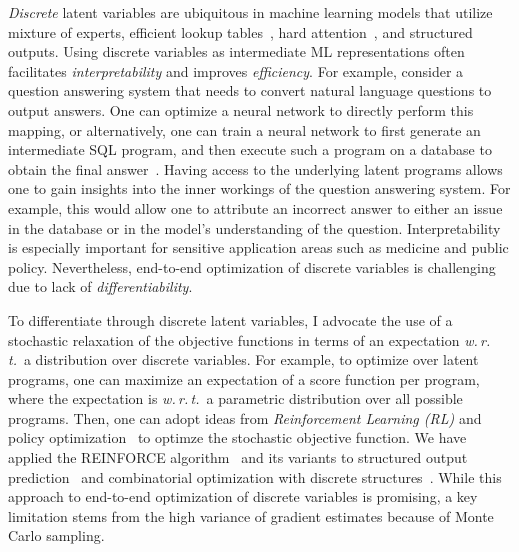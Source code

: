 \documentclass[a4paper, 10pt]{article}
\begin{document}
\hspace{\parindent} {\em Discrete} latent variables are ubiquitous in
machine learning models that utilize mixture of experts, efficient
lookup tables~\cite{mih}, hard attention~\cite{hardattention}, and
structured outputs. Using discrete variables as intermediate ML
representations often facilitates {\em interpretability} and improves
{\em efficiency}. For example, consider a question answering system
that needs to convert natural language questions to output
answers. One can optimize a neural network to directly perform this
mapping, or alternatively, one can train a neural network to first
generate an intermediate SQL program, and then execute such a program
on a database to obtain the final answer~\cite{mapo}. Having access to
the underlying latent programs allows one to gain insights into the
inner workings of the question answering system. For example, this
would allow one to attribute an incorrect answer to either an issue in the
database or in the model's understanding of the
question. Interpretability is especially important for sensitive
application areas such as medicine and public policy. Nevertheless,
end-to-end optimization of discrete variables is challenging due to
lack of {\em differentiability}.

To differentiate through discrete latent variables, I advocate the use
of a stochastic relaxation of the objective functions in terms of an
expectation {\em w.\,r.\,t.}~a distribution over discrete
variables. For example, to optimize over latent programs, one can
maximize an expectation of a score function per program, where the
expectation is {\em w.\,r.\,t.}~a parametric distribution over all
possible programs.  Then, one can adopt ideas from {\em Reinforcement
Learning (RL)} and policy optimization~\cite{sutton1998reinforcement}
to optimze the stochastic objective function. We have applied the
REINFORCE algorithm~\cite{reinforce} and its variants to structured
output prediction~\cite{wu2016gnmt} and combinatorial optimization
with discrete structures~\cite{bello2016neural,azalia2017}. While this
approach to end-to-end optimization of discrete variables is
promising, a key limitation stems from the high variance of gradient
estimates because of Monte Carlo sampling.
\end{document}
